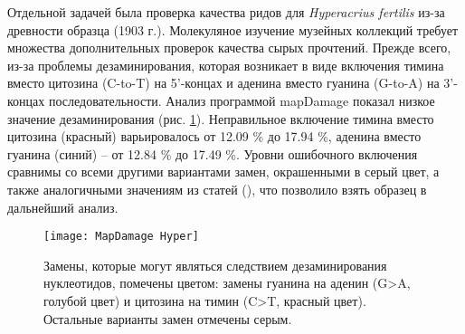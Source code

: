 

Отдельной задачей была проверка качества ридов для \textit{Hyperacrius fertilis} из-за древности образца (1903 г.). Молекуляное изучение музейных коллекций требует множества дополнительных проверок качества сырых прочтений. Прежде всего, из-за проблемы дезаминирования, которая возникает в виде включения тимина вместо цитозина (C-to-T) на 5'-концах и аденина вместо гуанина (G-to-A) на 3'-концах последовательности. Анализ программой mapDamage показал низкое значение дезаминирования (рис. \ref{MapDamage}). Неправильное включение тимина вместо цитозина (красный) варьировалось от 12.09 \% до 17.94 \%, аденина вместо гуанина (синий) -- от 12.84 \% до 17.49 \%. Уровни ошибочного включения сравнимы со всеми другими вариантами замен, окрашенными в серый цвет, а также аналогичными значениям из статей (\cite{Molto2017}), что позволило взять образец в дальнейший анализ. 


\begin{figure}[h!]
	\begin{center}
		\texttt{[image: MapDamage Hyper]}
	\end{center}
	\caption{Замены, которые могут являться следствием дезаминирования нуклеотидов, помечены цветом: замены гуанина на аденин (G>A, голубой цвет) и цитозина на тимин (C>T, красный цвет). Остальные варианты замен отмечены серым.}\label{MapDamage}
\end{figure}


